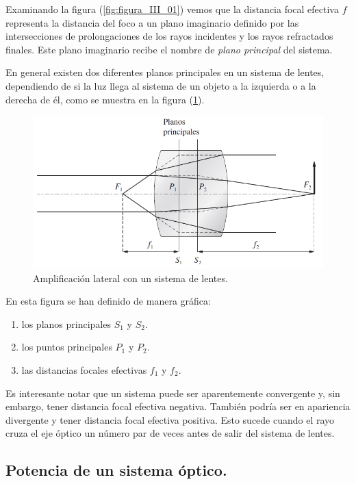 \documentclass[14pt]{extarticle}
\begin{document}
Examinando la figura (\ref{fig:figura_III_01}) vemos que la distancia focal efectiva $f$ representa la distancia del foco a un plano imaginario definido por las intersecciones de prolongaciones de los rayos incidentes y los rayos refractados finales. Este plano imaginario recibe el nombre de \textit{plano principal} del sistema.

En general existen dos diferentes planos principales en un sistema de lentes,
dependiendo de si la luz llega al sistema de un objeto a la izquierda o a la derecha de él, como se muestra en la figura (\ref{fig:figura_III_02}).
\begin{figure}[H]
    \centering
    \includegraphics[scale=0.7]{Imagenes/Lentes_Gruesas_02.png}
    \caption{Amplificación lateral con un sistema de lentes.}
    \label{fig:figura_III_02}
\end{figure}
En esta figura se han definido de manera gráfica:
\begin{enumerate}[label=\alph*)]
\item los planos principales $S_{1}$ y $S_{2}$.
\item los puntos principales $P_{1}$ y $P_{2}$.
\item las distancias focales efectivas $f_{1}$ y $f_{2}$.
\end{enumerate}
Es interesante notar que un sistema puede ser aparentemente convergente y, sin
embargo, tener distancia focal efectiva negativa. También podría ser en apariencia
divergente y tener distancia focal efectiva positiva. Esto sucede cuando el rayo cruza el eje óptico un número par de veces antes de salir del sistema de lentes.

\subsection{Potencia de un sistema óptico.}
\end{document}

